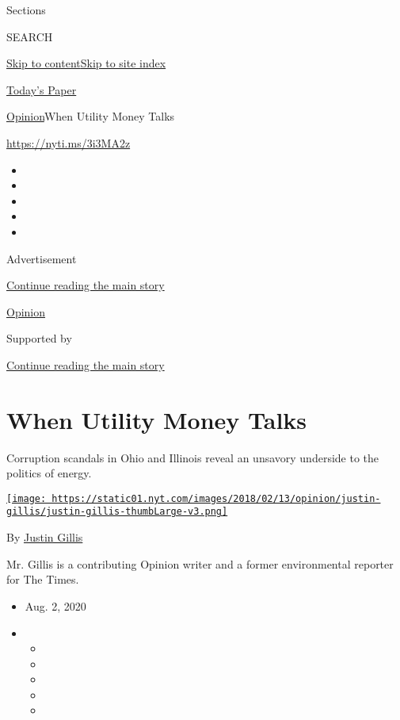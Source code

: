 Sections

SEARCH

\protect\hyperlink{site-content}{Skip to
content}\protect\hyperlink{site-index}{Skip to site index}

\href{https://myaccount.nytimes.com/auth/login?response_type=cookie\&client_id=vi}{}

\href{https://www.nytimes.com/section/todayspaper}{Today's Paper}

\href{/section/opinion}{Opinion}\textbar{}When Utility Money Talks

\href{https://nyti.ms/3i3MA2z}{https://nyti.ms/3i3MA2z}

\begin{itemize}
\item
\item
\item
\item
\item
\end{itemize}

Advertisement

\protect\hyperlink{after-top}{Continue reading the main story}

\href{/section/opinion}{Opinion}

Supported by

\protect\hyperlink{after-sponsor}{Continue reading the main story}

\hypertarget{when-utility-money-talks}{%
\section{When Utility Money Talks}\label{when-utility-money-talks}}

Corruption scandals in Ohio and Illinois reveal an unsavory underside to
the politics of energy.

\href{https://www.nytimes.com/by/justin-gillis}{\texttt{[image: https://static01.nyt.com/images/2018/02/13/opinion/justin-gillis/justin-gillis-thumbLarge-v3.png]}}

By \href{https://www.nytimes.com/by/justin-gillis}{Justin Gillis}

Mr. Gillis is a contributing Opinion writer and a former environmental
reporter for The Times.

\begin{itemize}
\item
  Aug. 2, 2020
\item
  \begin{itemize}
  \item
  \item
  \item
  \item
  \item
  \end{itemize}
\end{itemize}

